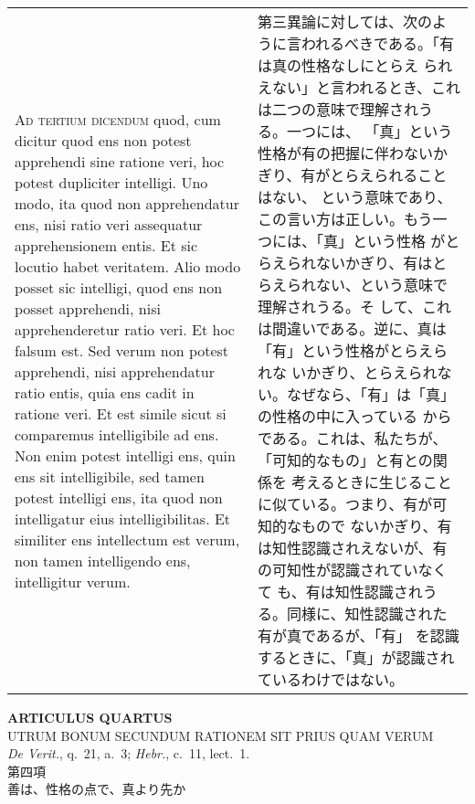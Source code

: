 \documentclass[10pt]{jsarticle} %
\begin{document}
\begin{longtable}{p{21em}p{21em}}
\\


{\scshape Ad tertium dicendum} quod, cum dicitur quod ens non potest
 apprehendi sine ratione veri, hoc potest dupliciter intelligi. Uno
 modo, ita quod non apprehendatur ens, nisi ratio veri assequatur
 apprehensionem entis. Et sic locutio habet veritatem. Alio modo posset
 sic intelligi, quod ens non posset apprehendi, nisi apprehenderetur
 ratio veri. Et hoc falsum est. Sed verum non potest apprehendi, nisi
 apprehendatur ratio entis, quia ens cadit in ratione veri. Et est
 simile sicut si comparemus intelligibile ad ens. Non enim potest
 intelligi ens, quin ens sit intelligibile, sed tamen potest intelligi
 ens, ita quod non intelligatur eius intelligibilitas. Et similiter ens
 intellectum est verum, non tamen intelligendo ens, intelligitur verum.


&

第三異論に対しては、次のように言われるべきである。「有は真の性格なしにとらえ
られえない」と言われるとき、これは二つの意味で理解されうる。一つには、
「真」という性格が有の把握に伴わないかぎり、有がとらえられることはない、
という意味であり、この言い方は正しい。もう一つには、「真」という性格
がとらえられないかぎり、有はとらえられない、という意味で理解されうる。そ
して、これは間違いである。逆に、真は「有」という性格がとらえられな
いかぎり、とらえられない。なぜなら、「有」は「真」の性格の中に入っている
からである。これは、私たちが、「可知的なもの」と有との関係を
 考えるときに生じることに似ている。つまり、有が可知的なもので
 ないかぎり、有は知性認識されえないが、有の可知性が認識されていなくて
 も、有は知性認識されうる。同様に、知性認識された有が真であるが、「有」
 を認識するときに、「真」が認識されているわけではない。






\end{longtable}
\newpage


\begin{center}
 {\Large {\bf ARTICULUS QUARTUS}}\\
 {\large UTRUM BONUM SECUNDUM RATIONEM SIT PRIUS QUAM VERUM}\\
 {\footnotesize {\itshape De Verit.}, q.~21, a.~3; {\itshape Hebr.},
 c.~11, lect.~1.}\\
 {\Large 第四項\\善は、性格の点で、真より先か}
\end{center}
\end{document}
